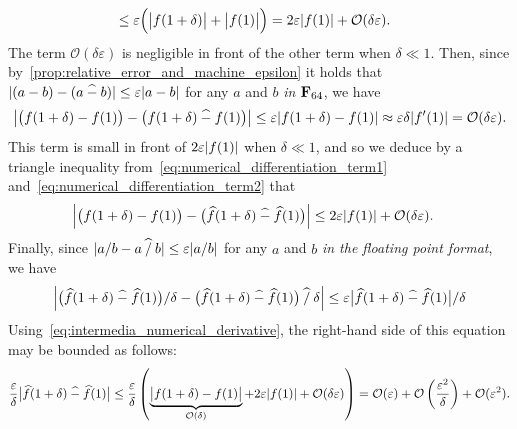 \begin{solution}
\begin{align}
        \label{eq:numerical_differentiation_term1}
        &\leq \varepsilon \Bigl( \bigl\lvert f(1 + \delta) \bigr\rvert + \bigl\lvert f(1) \bigr\rvert  \Bigr)
        = 2 \varepsilon \lvert f(1)\rvert + \mathcal O(\delta \varepsilon).
    \end{align}
    The term $\mathcal O(\delta \varepsilon)$ is negligible in front of the other term when $\delta \ll 1$.
    Then, since by~\cref{prop:relative_error_and_machine_epsilon} it holds that $\lvert (a-b) - (a \mathbin{\widehat -} b) \rvert \leq \varepsilon \lvert a-b\rvert$ for any $a$ and $b$ \emph{in $\mathbf F_{64}$},
    we have
    \begin{equation}
        \label{eq:numerical_differentiation_term2}
        \left\lvert \bigl(f(1 + \delta) - f(1)\bigr)  - \left(f(1 + \delta) \mathbin{\widehat -} f(1)\right)  \right\rvert
        \leq \varepsilon \lvert f(1 + \delta) - f(1) \rvert 
        \approx \varepsilon \delta \lvert f'(1) \rvert
        = \mathcal O(\delta \varepsilon).
    \end{equation}
    This term is small in front of $2 \varepsilon \lvert f(1)\rvert$ when $\delta \ll 1$,
    and so we deduce by a triangle inequality from~\eqref{eq:numerical_differentiation_term1} and~\eqref{eq:numerical_differentiation_term2} that
    \begin{align}
        \label{eq:intermedia_numerical_derivative}
        \left\lvert \bigl( f(1 + \delta) - f(1) \bigr)  
        - \bigl( \widehat f(1 + \delta) \mathbin{\widehat -} \widehat f(1) \bigr) \right\rvert
        &\leq  2 \varepsilon \lvert f(1)\rvert + \mathcal O(\delta \varepsilon).
    \end{align}
    Finally, since $\lvert a/b - a \mathbin{\widehat /} b\rvert \leq \varepsilon \lvert a/b \rvert$ for any $a$ and $b$ \emph{in the floating point format}, 
    we have
    \[
        \left\lvert \bigl( \widehat f(1 + \delta) \mathbin{\widehat -} \widehat f(1) \bigr) / \delta 
        - \bigl( \widehat f(1 + \delta) \mathbin{\widehat -} \widehat f(1) \bigr) \mathbin{\widehat /} \delta \right\rvert 
        \leq \varepsilon \bigl\lvert  \widehat f(1 + \delta) \mathbin{\widehat -} \widehat f(1) \bigr \rvert / \delta
    \]
    Using~\eqref{eq:intermedia_numerical_derivative},
    the right-hand side of this equation may be bounded as follows:
    \[
        \frac{\varepsilon}{\delta} \bigl\lvert  \widehat f(1 + \delta) \mathbin{\widehat -} \widehat f(1) \bigr \rvert 
        \leq 
        \frac{\varepsilon}{\delta} \left( \underbrace{ \bigl\lvert  f(1 + \delta) - f(1) \bigr \rvert }_{\mathcal O(\delta)}  + 2 \varepsilon \lvert f(1)\rvert + \mathcal O(\delta \varepsilon) \right)
        = \mathcal O(\varepsilon) + \mathcal O\left(\frac{\varepsilon^2}{\delta} \right) + \mathcal O(\varepsilon^2).
\]
\end{solution}
